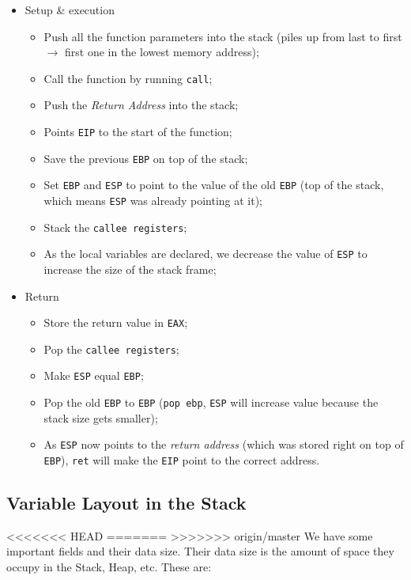 \documentclass[11pt]{article}
\begin{document}
\begin{itemize}
\item Setup \& execution
\begin{itemize}
\item Push all the function parameters into the stack (piles up from last to first \(\to\) first one in the lowest memory address);
\item Call the function by running \texttt{call};
\item Push the \emph{Return Address} into the stack;
\item Points \texttt{EIP} to the start of the function;
\item Save the previous \texttt{EBP} on top of the stack;
\item Set \texttt{EBP} and \texttt{ESP} to point to the value of the old \texttt{EBP} (top of the stack, which means \texttt{ESP} was already pointing at it);
\item Stack the \texttt{callee registers};
\item As the local variables are declared, we decrease the value of \texttt{ESP} to increase the size of the stack frame;
\end{itemize}
\item Return 
\begin{itemize}
\item Store the return value in \texttt{EAX};
\item Pop the \texttt{callee registers};
\item Make \texttt{ESP} equal \texttt{EBP};
\item Pop the old \texttt{EBP} to \texttt{EBP} (\texttt{pop ebp}, \texttt{ESP} will increase value because the stack size gets smaller);
\item As \texttt{ESP} now points to the \emph{return address} (which was stored right on top of \texttt{EBP}), \texttt{ret} will make the \texttt{EIP} point to the correct address.
\end{itemize}
\end{itemize}

\subsection{Variable Layout in the Stack}
<<<<<<< HEAD
\label{sec:orgc7237fb}
=======
\label{sec:org6a64eb8}
>>>>>>> origin/master
\label{sec:VarLayoutStack}
We have some important fields and their data size. Their data size is the amount of space they occupy in the Stack, Heap, etc. These are:
\end{document}
